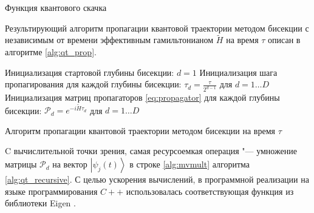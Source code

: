 \IncMargin{1em}
\begin{algorithm}
	\SetAlgoLined
	\caption{Функция квантового скачка}
	\label{alg:qt_jump}
\end{algorithm}
\DecMargin{1em}

Результирующий алгоритм пропагации квантовой траектории методом бисекции с независимым от времени эффективным гамильтонианом \(\tilde{H}\) на время \(\tau\) описан в алгоритме \ref{alg:qt_prop}.

\IncMargin{1em}
\begin{algorithm}
	\SetAlgoLined
	
	Инициализация стартовой глубины бисекции: \(d=1\)\;
	Инициализация шага пропагирования для каждой глубины бисекции: \(\tau_d = \frac{\tau}{2^{d-1}}\) для \(d=1 \ldots D\)\;
	Инициализация матриц пропагаторов \cref{eq:propagator} для каждой глубины бисекции: \(\mathcal{P}_{d} = e^{-i \tilde{H} \tau_d}\) для \(d=1 \ldots D\)\;
	\;

	\caption{Алгоритм пропагации квантовой траектории методом бисекции на время \(\tau\)}
	\label{alg:qt_prop}
\end{algorithm}
\DecMargin{1em}


C вычислительной точки зрения, самая ресурсоемкая операция "--- умножение матрицы \(\mathcal{P}_{d}\) на вектор \(\left| \psi_j(t) \right\rangle \) в строке \ref{alg:mvmult} алгоритма \ref{alg:qt_recursive}. С целью ускорения вычислений, в программной реализации на языке программирования \(C++\) использовалась соответствующая функция из библиотеки Eigen \cite{eigenweb}.


